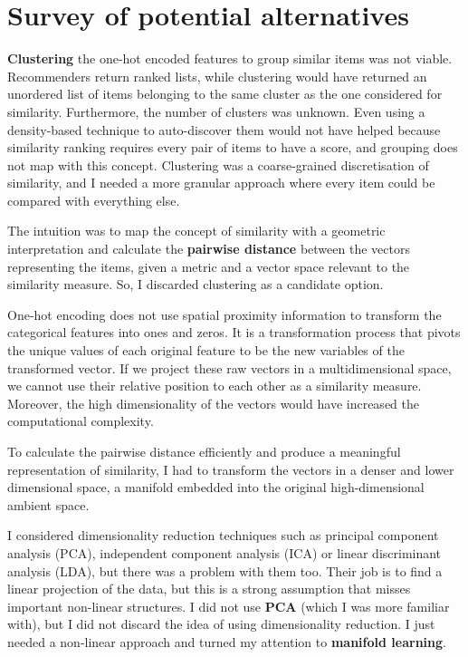 
\section{Survey of potential alternatives}

\textbf{Clustering} the one-hot encoded features to group similar items was not viable.
Recommenders return ranked lists, while clustering would have returned an unordered list of items
belonging to the same cluster as the one considered for similarity.
Furthermore, the number of clusters was unknown.
Even using a density-based technique to auto-discover them would not have helped
because similarity ranking requires every pair of items to have a score,
and grouping does not map with this concept.
Clustering was a coarse-grained discretisation of similarity,
and I needed a more granular approach where every item could be compared with everything else.

The intuition was to map the concept of similarity with a geometric interpretation
and calculate the \textbf{pairwise distance} between the vectors representing the items,
given a metric and a vector space relevant to the similarity measure.
So, I discarded clustering as a candidate option.

One-hot encoding does not use spatial proximity information to transform the categorical features into ones and zeros.
It is a transformation process that pivots the unique values of each original feature to be the new variables of the transformed vector.
If we project these raw vectors in a multidimensional space, we cannot use their relative position to each other as a similarity measure.
Moreover, the high dimensionality of the vectors would have increased the computational complexity.

To calculate the pairwise distance efficiently and produce a meaningful representation of similarity,
I had to transform the vectors in a denser and lower dimensional space,
a manifold embedded into the original high-dimensional ambient space.

I considered dimensionality reduction techniques such as principal component analysis (PCA),
independent component analysis (ICA) or linear discriminant analysis (LDA), but there was a problem with them too.
Their job is to find a linear projection of the data, but this is a strong assumption that misses important non-linear structures.
I did not use \textbf{PCA} (which I was more familiar with), but I did not discard the idea of using dimensionality reduction.
I just needed a non-linear approach and turned my attention to \textbf{manifold learning}.


